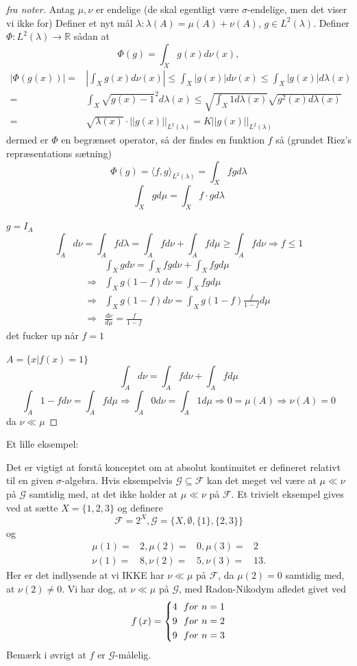 \documentclass[12pt]{report}
\theoremstyle{break}
\newtheorem*{proof}{Bevis}
\theoremstyle{break}
\newcommand{\RR}{\mathbb{R}}
\newcommand{\G}{\mathcal{G}}
\newcommand{\FI}{\mathcal{F}}
\newcommand{\1}{\mathds{1}}
\begin{document}
\begin{proof}[fra noter]
	 Antag $\mu,\nu$ er endelige (de skal egentligt være $\sigma$-endelige, men det viser vi ikke for)
	 Definer et nyt mål $\lambda\colon\lambda(A) = \mu(A)+\nu(A)$,  $g\in L^2(\lambda)$.
	 Definer $\Phi \colon L^2(\lambda) \to \RR$ sådan at
	\[ \Phi(g)=\int_Xg(x)d\nu(x), \]
	\begin{align*}
		|\Phi(g(x))|=&\left\vert \int_X g(x)d\nu(x)\right\vert \leq \int_X |g(x)|d\nu(x) \leq \int_X |g(x)|d\lambda(x)\\
		=&\int_X \sqrt{g(x)-1}^2d\lambda(x)\leq \sqrt{\int_X 1 d\lambda(x)}\sqrt{g^2(x)d\lambda(x)}\\
		=&\sqrt{\lambda(x)}\cdot ||g(x)||_{L^2(\lambda)}=K||g(x)||_{L^2(\lambda)}
	\end{align*}
	dermed er $\Phi$ en begrænset operator, så der findes en funktion $f$ så (grundet Riez's repræsentations sætning)
	\[ \Phi(g)= \langle f,g \rangle_{L^2(\lambda)}=\int_X fgd\lambda \]
	\[ \int_Xgd\mu=\int_X f\cdot g d\lambda \]
	
	
	$g=I_A$
	\[\int_A d\nu=\int_A fd\lambda = \int_A fd\nu+\int_A fd\mu \geq \int_A f d\nu \Rightarrow f\leq 1\]
	\begin{align*}
		&\int_X g d \nu=\int_Xfgd\nu+\int_Xfgd\mu\\
		\Rightarrow&\int_X g(1-f)d\nu=\int_Xfgd\mu\\
		\Rightarrow&\int_Xg(1-f)d\nu=\int_Xg(1-f)\frac{f}{1-f}d\mu\\
		\Rightarrow&\frac{d\nu}{d\mu}=\frac{f}{1-f}
	\end{align*}
	det fucker up når $f=1$
	
	$A=\{ x |f(x)=1 \}$
	\[ \int_A d\nu =\int_A f d \nu +\int_A fd\mu \]
	\[ \int_A 1-f d\nu=\int_A fd \mu \Rightarrow\int_A 0 d\nu = \int_A 1d\mu \Rightarrow0=\mu(A)\Rightarrow\nu(A)=0 \]
	da $\nu\ll\mu$
\end{proof}
Et lille eksempel:

	Det er vigtigt at forstå konceptet om at absolut kontinuitet er defineret relativt til en given $\sigma$-algebra. Hvis eksempelvis $\G \subseteq\FI$ kan det meget vel være at $\mu\ll\nu$ på $\G$ samtidig med, at det ikke holder at $\mu\ll\nu$ på $\FI$. Et trivielt eksempel gives ved at sætte $X=\{1,2,3\} $ og definere
	\[ \FI=2^X, \G=\{X,\emptyset,\{1\},\{2,3\}\} \]
	og
	\begin{align*}
		\mu(1)=&2, \mu(2)=&0, \mu(3)=&2\\
		\nu(1)=&8, \nu(2)=&5, \nu(3)=&13. 
	\end{align*}
	Her er det indlysende at vi IKKE har $\nu\ll\mu$ på $\FI$, da $\mu(2)=0$ samtidig med, at $\nu(2)\neq 0$. Vi har dog, at $\nu\ll\mu$ på $\G$, med Radon-Nikodym afledet givet ved
	\[f\left( x \right) = \left\{ \begin{gathered}
	4\hfill ~~for\,\, n=1 \\
	9\hfill ~~for\,\, n=2 \\
	9\hfill ~~for\,\, n=3 
	\end{gathered}  \right.\]
Bemærk i øvrigt at $f$ er $\G$-målelig.
\end{document}
